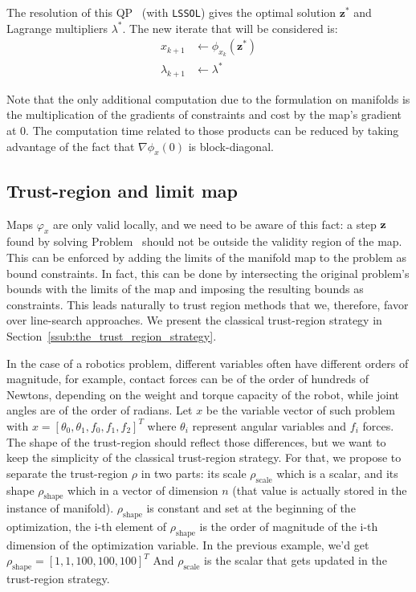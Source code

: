 The resolution of this QP~ (with {\tt LSSOL}) gives the optimal solution $\mathbf{z}^*$ and Lagrange multipliers $\lambda^*$.
The new iterate that will be considered is:
\begin{align}
  x_{k+1} & \leftarrow \phi_{x_k}(\mathbf{z}^*)\\
  \lambda_{k+1} & \leftarrow \lambda^*
\end{align}

Note that the only additional computation due to the formulation on manifolds is the multiplication of the gradients of constraints and cost by the map's gradient at $0$.
The computation time related to those products can be reduced by taking advantage of the fact that $\nabla \phi_x(0)$ is block-diagonal.

\subsection{Trust-region and limit map}
\label{sub:trust_region_and_limit_map}

Maps $\varphi_{x}$ are only valid locally, and we need to be aware of this fact: a step ${\bf z}$ found by solving Problem~ should not be outside the validity region of the map.
This can be enforced by adding the limits of the manifold map to the problem as bound constraints.
In fact, this can be done by intersecting the original problem's bounds with the limits of the map and imposing the resulting bounds as constraints.
This leads naturally to trust region methods that we, therefore, favor over line-search approaches.
We present the classical trust-region strategy in Section~\ref{ssub:the_trust_region_strategy}.

In the case of a robotics problem, different variables often have different orders of magnitude, for example, contact forces can be of the order of hundreds of Newtons, depending on the weight and torque capacity of the robot, while joint angles are of the order of radians.
Let $x$ be the variable vector of such problem with $x={[\theta_0, \theta_1, f_0, f_1, f_2]}^T$ where $\theta_i$ represent angular variables and $f_i$ forces.
The shape of the trust-region should reflect those differences, but we want to keep the simplicity of the classical trust-region strategy.
For that, we propose to separate the trust-region $\rho$ in two parts: its scale $\rho_\text{scale}$ which is a scalar, and its shape $\rho_\text{shape}$ which in a vector of dimension $n$ (that value is actually stored in the instance of manifold).
$\rho_\text{shape}$ is constant and set at the beginning of the optimization, the i-th element of $\rho_\text{shape}$ is the order of magnitude of the i-th dimension of the optimization variable.
In the previous example, we'd get ${\rho_\text{shape}} = {[1,1,100,100,100]}^T$
And $\rho_\text{scale}$ is the scalar that gets updated in the trust-region strategy.

